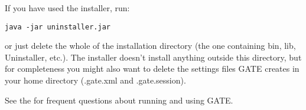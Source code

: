If you have used the installer, run:

\begin{small}
\begin{verbatim}
java -jar uninstaller.jar
\end{verbatim}
\end{small}

or just delete the whole of the installation directory (the one containing
bin, lib, Uninstaller, etc.). The installer doesn't install anything outside
this directory, but for completeness you might also want to delete the
settings files GATE creates in your home directory (.gate.xml and
.gate.session).


See the  for frequent questions about running and using GATE.

